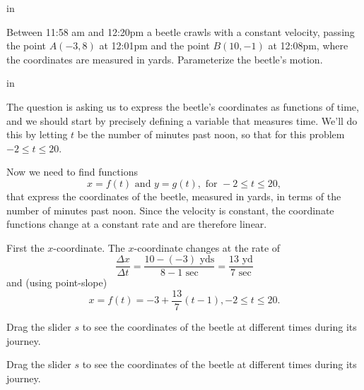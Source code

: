 \documentclass{ximera}
\newcommand{\pskip}{\vskip 0.1 in}
\begin{document}
\pskip

 Between 11:58 am and 12:20pm a beetle crawls with a constant velocity, passing the point $A(-3,8)$ at 12:01pm and the point $B(10,-1)$ at 12:08pm, where the coordinates are measured in yards. Parameterize the beetle's motion.

\pskip

 The question is asking us to express the beetle's coordinates as functions of time, and we should start by precisely defining a variable that measures time. We'll do this by letting $t$ be the number of minutes past noon, so that for this problem $-2 \leq t \leq 20$. 

Now we need to find functions
\[
   x = f(t) \text{ and } y = g(t) , \text{ for } -2\leq t \leq 20 ,
\]
that express the coordinates of the beetle, measured in yards, in terms of the number of minutes past noon.  Since the velocity is constant, the coordinate functions change at a constant rate and are therefore linear.

First the $x$-coordinate. The $x$-coordinate changes at the rate of 
\[
    \frac{\Delta x}{\Delta t} = \frac{10-(-3) \text{ yds}}{8-1 \text{ sec}} = \frac{13 \text{ yd}}{7 \text{ sec}}
\]
and (using point-slope) 
\[
     x = f(t) = -3 + \frac{13}{7}(t-1) , -2\leq t \leq 20 .
\]

\begin{exploration}\label{exp:pc1}
Drag the slider $s$ to see the coordinates of the beetle at different times during its journey.
 
 
\begin{onlineOnly}
    \begin{center}
\end{center}
\end{onlineOnly}
\end{exploration}



\begin{exploration}\label{exp:pc1b}
Drag the slider $s$ to see the coordinates of the beetle at different times during its journey.
 
 
\begin{onlineOnly}
    \begin{center}
\end{center}
\end{onlineOnly}
\end{exploration}
\end{document}
